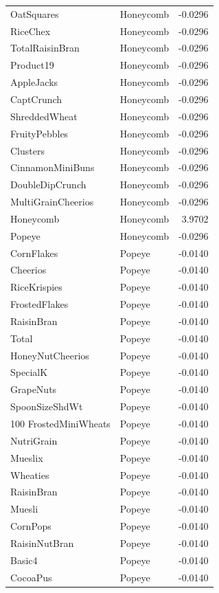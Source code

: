 \begin{longtable}{llr}
OatSquares & Honeycomb & -0.0296 \\
RiceChex & Honeycomb & -0.0296 \\
TotalRaisinBran & Honeycomb & -0.0296 \\
Product19 & Honeycomb & -0.0296 \\
AppleJacks & Honeycomb & -0.0296 \\
CaptCrunch & Honeycomb & -0.0296 \\
ShreddedWheat & Honeycomb & -0.0296 \\
FruityPebbles & Honeycomb & -0.0296 \\
Clusters & Honeycomb & -0.0296 \\
CinnamonMiniBuns & Honeycomb & -0.0296 \\
DoubleDipCrunch & Honeycomb & -0.0296 \\
MultiGrainCheerios & Honeycomb & -0.0296 \\
Honeycomb & Honeycomb & 3.9702 \\
Popeye & Honeycomb & -0.0296 \\
CornFlakes & Popeye & -0.0140 \\
Cheerios & Popeye & -0.0140 \\
RiceKrispies & Popeye & -0.0140 \\
FrostedFlakes & Popeye & -0.0140 \\
RaisinBran & Popeye & -0.0140 \\
Total & Popeye & -0.0140 \\
HoneyNutCheerios & Popeye & -0.0140 \\
SpecialK & Popeye & -0.0140 \\
GrapeNuts & Popeye & -0.0140 \\
SpoonSizeShdWt & Popeye & -0.0140 \\
100%
FrostedMiniWheats & Popeye & -0.0140 \\
NutriGrain & Popeye & -0.0140 \\
Mueslix & Popeye & -0.0140 \\
Wheaties & Popeye & -0.0140 \\
RaisinBran & Popeye & -0.0140 \\
Muesli & Popeye & -0.0140 \\
CornPops & Popeye & -0.0140 \\
RaisinNutBran & Popeye & -0.0140 \\
Basic4 & Popeye & -0.0140 \\
CocoaPus & Popeye & -0.0140 \\

\end{longtable}
